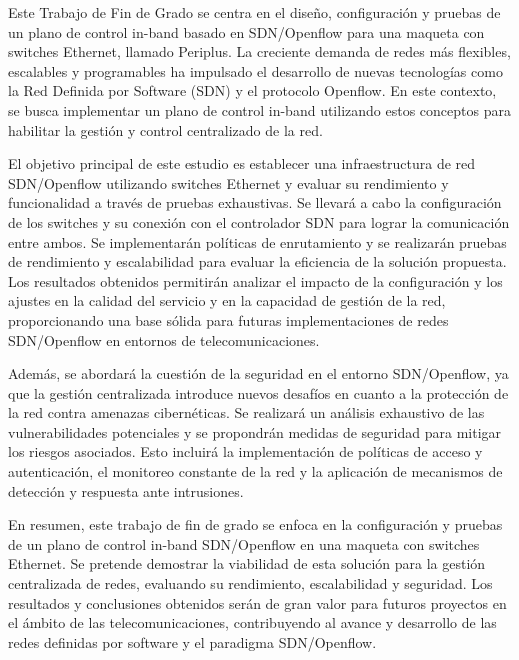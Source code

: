 \documentclass[a4paper, 12pt]{book}
\begin{document}
	Este Trabajo de Fin de Grado se centra en el diseño, configuración y pruebas de un plano de control in-band basado en SDN/Openflow para una maqueta con switches Ethernet, llamado Periplus. La creciente demanda de redes más flexibles, escalables y programables ha impulsado el desarrollo de nuevas tecnologías como la Red Definida por Software (SDN) y el protocolo Openflow. En este contexto, se busca implementar un plano de control in-band utilizando estos conceptos para habilitar la gestión y control centralizado de la red.
	
	El objetivo principal de este estudio es establecer una infraestructura de red SDN/Openflow utilizando switches Ethernet y evaluar su rendimiento y funcionalidad a través de pruebas exhaustivas. Se llevará a cabo la configuración de los switches y su conexión con el controlador SDN para lograr la comunicación entre ambos. Se implementarán políticas de enrutamiento y se realizarán pruebas de rendimiento y escalabilidad para evaluar la eficiencia de la solución propuesta. Los resultados obtenidos permitirán analizar el impacto de la configuración y los ajustes en la calidad del servicio y en la capacidad de gestión de la red, proporcionando una base sólida para futuras implementaciones de redes SDN/Openflow en entornos de telecomunicaciones.
	
	Además, se abordará la cuestión de la seguridad en el entorno SDN/Openflow, ya que la gestión centralizada introduce nuevos desafíos en cuanto a la protección de la red contra amenazas cibernéticas. Se realizará un análisis exhaustivo de las vulnerabilidades potenciales y se propondrán medidas de seguridad para mitigar los riesgos asociados. Esto incluirá la implementación de políticas de acceso y autenticación, el monitoreo constante de la red y la aplicación de mecanismos de detección y respuesta ante intrusiones.
	
	En resumen, este trabajo de fin de grado se enfoca en la configuración y pruebas de un plano de control in-band SDN/Openflow en una maqueta con switches Ethernet. Se pretende demostrar la viabilidad de esta solución para la gestión centralizada de redes, evaluando su rendimiento, escalabilidad y seguridad. Los resultados y conclusiones obtenidos serán de gran valor para futuros proyectos en el ámbito de las telecomunicaciones, contribuyendo al avance y desarrollo de las redes definidas por software y el paradigma SDN/Openflow.
	
	
\end{document}

